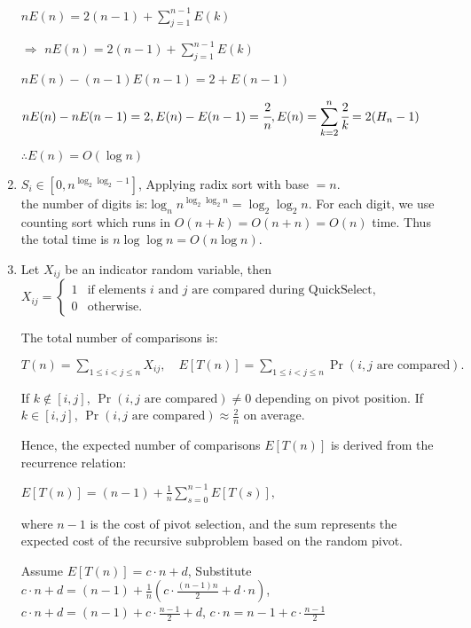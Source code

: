 \documentclass[12pt,a4paper]{article}
\begin{document}
\begin{enumerate}
    $
    n E(n) = 2(n-1) +\displaystyle\sum_{j=1}^{n-1} E(k)
    $

    $ \Rightarrow $ $ n E(n) = 2(n-1) +\displaystyle\sum_{j=1}^{n-1} E(k) $

    $
    n E(n) - (n-1) E(n-1) = 2 + E(n-1)
    $

    $
    n E(n) - n E(n-1) =2, E(n)-E(n-1)=\cfrac{2}{n}, E(n) =\displaystyle\sum_{k=2}^{n} \cfrac{2}{k} = 2(H_n-1)
    $

    $\therefore  E(n) = O(\log n) $
    \item $S_i\in [0, n^{\log_2\log_2-1}]$, Applying radix sort with base $=n$.
    \\the number of digits is:$\log_n n^{\log_2\log_2n} = \log_2\log_2n$. For each digit, we use counting sort which runs in $O(n+k)=O(n+n)=O(n)$ time. Thus the total time is $n\log\log n=O(n\log n)$.
    \item Let \( X_{ij} \) be an indicator random variable, then\\
        $
        X_{ij} = 
        \begin{cases} 
        1 & \text{if elements } i \text{ and } j \text{ are compared during QuickSelect}, \\
        0 & \text{otherwise}.
        \end{cases}
        $

        The total number of comparisons is:

        $
        T(n) = \sum_{1 \leq i < j \leq n} X_{ij}, \quad E[T(n)] = \sum_{1 \leq i < j \leq n} \Pr(i, j \text{ are compared}).
        $

        If \( k \notin [i, j] \), \(\Pr(i, j \text{ are compared}) \neq 0\) depending on pivot position.
        If \( k \in [i, j] \), \(\Pr(i, j \text{ are compared}) \approx \frac{2}{n}\) on average.

        Hence, the expected number of comparisons \( E[T(n)] \) is derived from the recurrence relation:

        $
        E[T(n)] = (n - 1) + \frac{1}{n} \sum_{s=0}^{n-1} E[T(s)],
        $

        where \( n - 1 \) is the cost of pivot selection, and the sum represents the expected cost of the recursive subproblem based on the random pivot.

        Assume \( E[T(n)] = c \cdot n + d \), Substitute \( c \cdot n + d = (n - 1) + \frac{1}{n} \left( c \cdot \frac{(n-1)n}{2} + d \cdot n \right) \),
        \( c \cdot n + d = (n - 1) + c \cdot \frac{n-1}{2} + d \),
        \( c \cdot n = n - 1 + c \cdot \frac{n-1}{2} \)


\end{enumerate}
\end{document}
